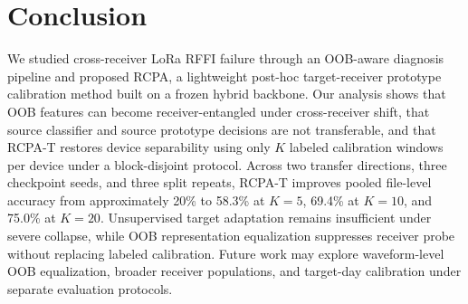 \section{Conclusion}
\label{sec:conclusion}

We studied cross-receiver LoRa RFFI failure through an OOB-aware diagnosis pipeline and proposed RCPA, a lightweight post-hoc target-receiver prototype calibration method built on a frozen hybrid backbone.
Our analysis shows that OOB features can become receiver-entangled under cross-receiver shift, that source classifier and source prototype decisions are not transferable, and that RCPA-T restores device separability using only $K$ labeled calibration windows per device under a block-disjoint protocol.
Across two transfer directions, three checkpoint seeds, and three split repeats, RCPA-T improves pooled file-level accuracy from approximately 20\% to 58.3\% at $K{=}5$, 69.4\% at $K{=}10$, and 75.0\% at $K{=}20$.
Unsupervised target adaptation remains insufficient under severe collapse, while OOB representation equalization suppresses receiver probe without replacing labeled calibration.
Future work may explore waveform-level OOB equalization, broader receiver populations, and target-day calibration under separate evaluation protocols.
